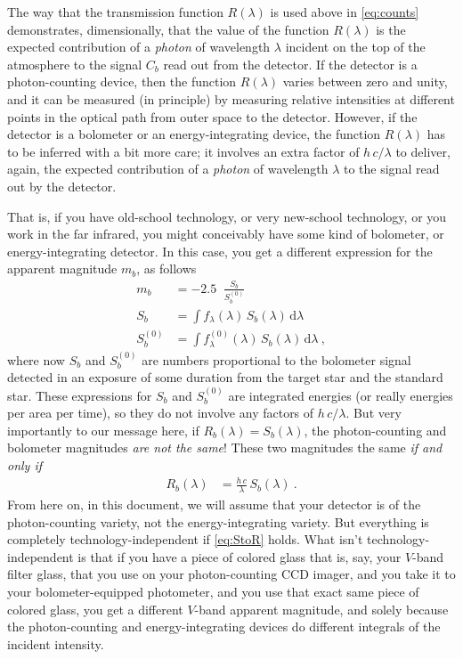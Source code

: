 \documentclass[10pt]{article}
\newcommand{\dd}{\mathrm{d}}
\DeclareMathOperator{\logten}{log_{10}}
\begin{document}
The way that the transmission function $R(\lambda)$ is used above in \eqref{eq:counts} demonstrates, dimensionally,
that the value of the function $R(\lambda)$ is the expected contribution of a \emph{photon} of wavelength
$\lambda$ incident on the top of the atmosphere to the signal $C_b$ read out from the detector.
If the detector is a photon-counting device, then the function $R(\lambda)$ varies between zero and unity, and it can
be measured (in principle) by measuring relative intensities at different points in the optical path from outer space
to the detector.
However, if the detector is a bolometer or an energy-integrating device, the function $R(\lambda)$ has to be inferred
with a bit more care; it involves an extra factor of $h\,c/\lambda$ to deliver, again, the expected contribution of
a \emph{photon} of wavelength $\lambda$ to the signal read out by the detector.

That is, if you have old-school technology, or very new-school technology, or you work in the far infrared, you might conceivably have some kind of bolometer, or energy-integrating detector.
In this case, you get a different expression for the apparent magnitude $m_b$, as follows
\begin{align}
    m_b &= -2.5\logten\frac{S_b}{S^{(0)}_b}\\
    S_b &= \int f_\lambda(\lambda)\,S_b(\lambda)\,\dd\lambda\\
    S^{(0)}_b &= \int f^{(0)}_\lambda(\lambda)\,S_b(\lambda)\,\dd\lambda~,
\end{align}
where now $S_b$ and $S^{(0)}_b$ are numbers proportional to the bolometer signal detected in an exposure of some duration from the target star and the standard star.
These expressions for $S_b$ and $S^{(0)}_b$ are integrated energies (or really energies per area per time), so they do not involve any factors of $h\,c/\lambda$.
But very importantly to our message here, if $R_b(\lambda)=S_b(\lambda)$, the photon-counting and bolometer magnitudes \emph{are not the same}!
These two magnitudes the same \emph{if and only if}
\begin{align}
    R_b(\lambda) &= \frac{h\,c}{\lambda}\,S_b(\lambda)~.\label{eq:StoR}
\end{align}
From here on, in this document, we will assume that your detector is of the photon-counting variety, not the energy-integrating variety.
But everything is completely technology-independent if \eqref{eq:StoR} holds.
What isn't technology-independent is that if you have a piece of colored glass that is, say, your $V$-band filter glass, that you use on your photon-counting CCD imager, and you take it to your bolometer-equipped photometer, and you use that exact same piece of colored glass, you get a different $V$-band apparent magnitude, and solely because the photon-counting and energy-integrating devices do different integrals of the incident intensity.
\end{document}
